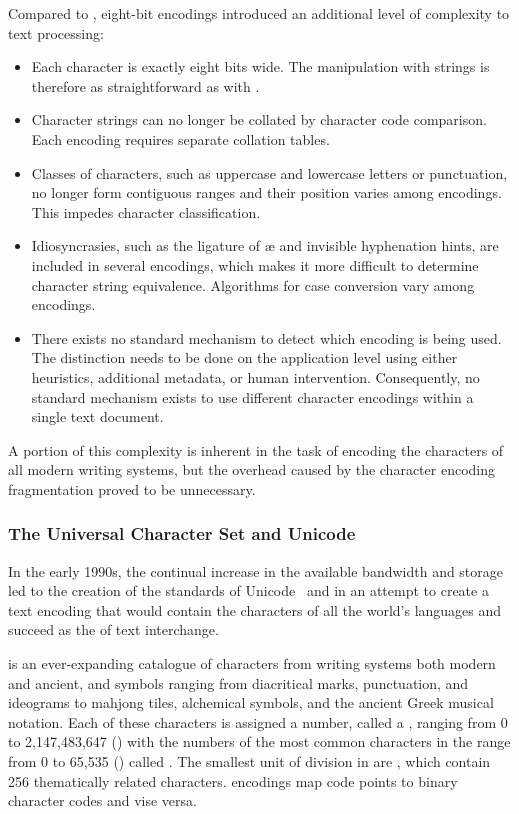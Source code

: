 Compared to , eight-bit encodings introduced an additional level
of complexity to text processing:
\begin{itemize}
  \item Each character is exactly eight bits wide. The manipulation with strings
    is therefore as straightforward as with .
  \item Character strings can no longer be collated by character code
    comparison. Each encoding requires separate collation tables.
  \item Classes of characters, such as uppercase and lowercase letters or
    punctuation, no longer form contiguous ranges and their position varies
    among encodings. This impedes character classification.
  \item Idiosyncrasies, such as the ligature of æ and invisible hyphenation
    hints, are included in several encodings, which makes it more difficult to
    determine character string equivalence. Algorithms for case conversion vary
    among encodings.
  \item There exists no standard mechanism to detect which encoding is being
    used. The distinction needs to be done on the application level using either
    heuristics, additional metadata, or human intervention. Consequently, no
    standard mechanism exists to use different character encodings within a
    single text document.
\end{itemize}
A portion of this complexity is inherent in the task of encoding the characters
of all modern writing systems, but the overhead caused by the character encoding
fragmentation proved to be unnecessary.

\subsubsection{The Universal Character Set and Unicode}\label{sec:ucs+unicode}
In the early 1990s, the continual increase in the available bandwidth and
storage led to the creation of the standards of
Unicode~\cite{unicode91,unicode92} and  in an attempt to create a
text encoding that would contain the characters of all the world's languages and
succeed  as the  of text
interchange.

 is an ever-expanding catalogue of characters from writing systems
both modern and ancient, and symbols ranging from diacritical marks,
punctuation, and ideograms to mahjong tiles, alchemical symbols, and the ancient
Greek musical notation. Each of these characters is assigned a number, called
a , ranging from 0 to 2,147,483,647 () with the
numbers of the most common characters in the range from 0 to 65,535
() called . The smallest unit of division in
 are , which contain 256
thematically related characters.  encodings map code points to
binary character codes and vise versa.

